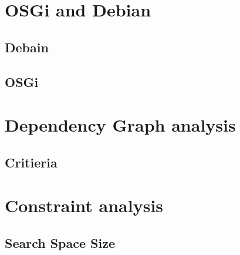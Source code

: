 
\section{OSGi and Debian}

\subsection{Debain}


\subsection{OSGi}


\section{Dependency Graph analysis}

\subsection{Critieria}




\section{Constraint analysis}


\subsection{Search Space Size}

